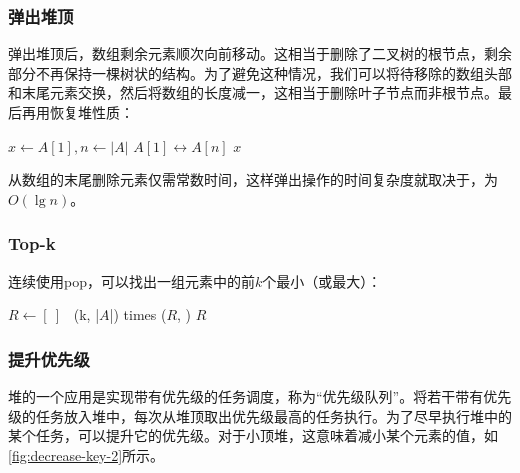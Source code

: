 \documentclass[b5paper]{ctexart}
\begin{document}
\subsubsection{弹出堆顶}
 

弹出堆顶后，数组剩余元素顺次向前移动。这相当于删除了二叉树的根节点，剩余部分不再保持一棵树状的结构。为了避免这种情况，我们可以将待移除的数组头部和末尾元素交换，然后将数组的长度减一，这相当于删除叶子节点而非根节点。最后再用恢复堆性质：

\begin{algorithmic}[1]
  \State $x \gets A [1], n \gets |A|$
  \State {} $A[1] \leftrightarrow A[n]$
  \State {}
    \State {}
  \EndIf
  \State \Return $x$
\EndFunction
\end{algorithmic}

从数组的末尾删除元素仅需常数时间，这样弹出操作的时间复杂度就取决于，为$O(\lg n)$。

\subsubsection{Top-k}

连续使用pop，可以找出一组元素中的前$k$个最小（或最大）：

\begin{algorithmic}[1]
  \State $R \gets [\ ]$
  \State {}
  \Loop \ (k, |$A$|) times 
    \State {}($R$, )
  \EndLoop
  \State \Return $R$
\EndFunction
\end{algorithmic}

\subsubsection{提升优先级}

堆的一个应用是实现带有优先级的任务调度，称为“优先级队列”。将若干带有优先级的任务放入堆中，每次从堆顶取出优先级最高的任务执行。为了尽早执行堆中的某个任务，可以提升它的优先级。对于小顶堆，这意味着减小某个元素的值，如\cref{fig:decrease-key-2}所示。
\end{document}
